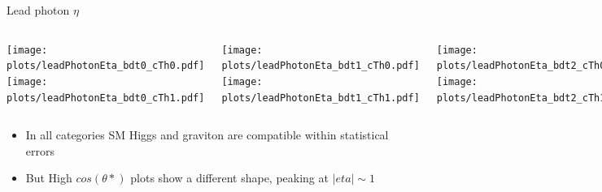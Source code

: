 \documentclass[8pt]{beamer}
\begin{document}
\begin{frame}{Lead photon $\eta$}

  \begin{block}
   
     \begin{columns}
     
      \centering
     
      \column[t]{3.0cm}
      \texttt{[image: plots/leadPhotonEta\_bdt0\_cTh0.pdf]} \\
      \texttt{[image: plots/leadPhotonEta\_bdt0\_cTh1.pdf]} 
      
      \column[t]{3.0cm}
      \texttt{[image: plots/leadPhotonEta\_bdt1\_cTh0.pdf]} \\
      \texttt{[image: plots/leadPhotonEta\_bdt1\_cTh1.pdf]}
      
      \column[t]{3.0cm}
      \texttt{[image: plots/leadPhotonEta\_bdt2\_cTh0.pdf]} \\
      \texttt{[image: plots/leadPhotonEta\_bdt2\_cTh1.pdf]}
      
      \column[t]{3.0cm}
      \texttt{[image: plots/leadPhotonEta\_bdt3\_cTh0.pdf]} \\
      \texttt{[image: plots/leadPhotonEta\_bdt3\_cTh1.pdf]}
      
    \end{columns}
  
  \end{block}

    \begin{itemize}
      \item In all categories SM Higgs and graviton are compatible within statistical errors
      \item But High $cos(\theta *)$ plots show a different shape, peaking at $|eta| \sim 1$
    \end{itemize}
  
\end{frame}
\end{document}
